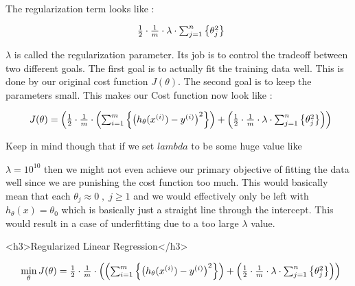 The regularization term looks like :

\[
	\begin{array}{ l@{} l@{} } 
		\frac{1}{2} \cdot
		\frac{1}{m} \cdot 
		\lambda \cdot
		\sum_{j = 1}^{n}
		\left\{
			{\theta_{j}^{2}}
		\right\} 
	\end{array}
\]

$\lambda$ is called the regularization parameter. Its job is to control the
tradeoff between two different goals. The first goal is to actually fit the
training data well. This is done by our original cost function $J(\theta)$. The
second goal is to keep the parameters small. This makes our Cost function now
look like :

\[
	\begin{array}{ l@{} l@{} } 
		J(\theta)
		=
		\left( 
		\frac{1}{2}
		\cdot
		\frac{1}{m}
		\cdot 
			\left(
				\sum_{i=1}^m
				\left\{
					\left(
						h_\theta(x^{(i)}) - y^{(i)}
					\right)^{2}
				\right\}
			\right) 
			+
			\left( 
				\frac{1}{2} \cdot
				\frac{1}{m} \cdot 
				\lambda \cdot
				\sum_{j = 1}^{n}
				\left\{
					{\theta_{j}^{2}}
				\right\}
			\right)
		\right) 
	\end{array} 
\]


Keep in mind though that if we set \( lambda \) to be some huge value like


\( \lambda = 10^{10} \) then we might not even achieve our primary objective of
fitting the data well since we are punishing the cost function too much. This
would basically mean that each \( \theta_j \approx 0 \; , \; j \geq 1 \) and we
would effectively only be left with \( h_{\theta}(x) = \theta_0 \) which is
basically just a straight line through the intercept.  This would result in a
case of underfitting due to a too large \( \lambda \) value.

	<h3>Regularized Linear Regression</h3>

	\[
		\begin{array}{ l@{} l@{} } 
			\min\limits_\theta
			J(\theta)
			=
			\frac{1}{2}
			\cdot
			\frac{1}{m}
			\cdot
			\left(
				\left(
					\sum_{i=1}^m
					\left\{
						\left(
							h_\theta(x^{(i)}) - y^{(i)}
						\right)^{2}
					\right\}
				\right) 
				+
				\left( 
					\frac{1}{2} \cdot
					\frac{1}{m} \cdot
					\lambda \cdot
					\sum_{j = 1}^{n}
					\left\{
						{\theta_{j}^{2}}
					\right\}
				\right)
			\right) 
		\end{array} 
	\]


\subsubsectionend

